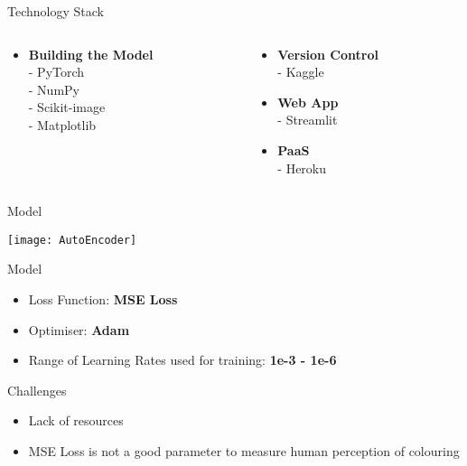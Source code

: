 \documentclass[12pt]{beamer}
\begin{document}
\begin{frame}{Technology Stack}
	\begin{columns}
		\begin{column}{0.5\textwidth}
			\begin{itemize}
				\item \textbf{Building the Model}\\
					- PyTorch\\
					- NumPy\\
					- Scikit-image\\
					- Matplotlib\\
			\end{itemize}
		\end{column}
		\begin{column}{0.5\textwidth}
			\begin{itemize}
				\item \textbf{Version Control}\\
					- Kaggle\\
				\item \textbf{Web App}\\
					- Streamlit\\
				\item \textbf{PaaS}\\
					- Heroku
			\end{itemize}
		\end{column}
	\end{columns}
\end{frame}

\begin{frame}{Model}
	\begin{center}
		\texttt{[image: AutoEncoder]}
	\end{center}
\end{frame}

\begin{frame}{Model}
	\begin{itemize}
		\item Loss Function: \textbf{MSE Loss}
		\item Optimiser: \textbf{Adam}
		\item Range of Learning Rates used for training: \textbf{1e-3 - 1e-6}
	\end{itemize}
\end{frame}

\begin{frame}{Challenges}
	\begin{itemize}
		\item Lack of resources
			\pause
		\item MSE Loss is not a good parameter to measure human perception of colouring
	\end{itemize}
\end{frame}
\end{document}
